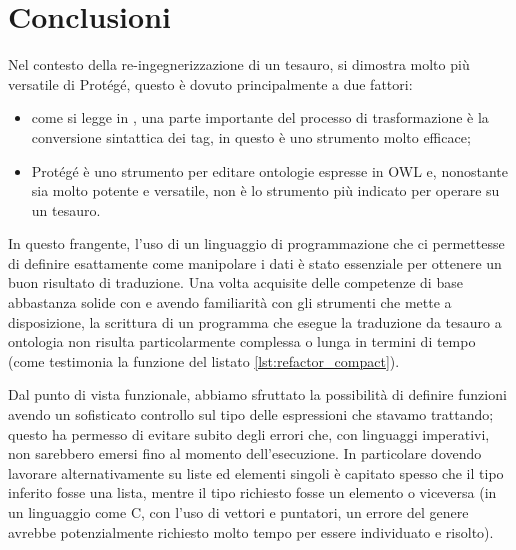 \section{Conclusioni}
Nel contesto della re-ingegnerizzazione di un tesauro, \cduce si dimostra molto più versatile di Protégé, questo è dovuto principalmente a due fattori:
\begin{itemize}
	\item come si legge in \cite{re_engineeringThesaurus}, una parte importante del processo di trasformazione è la conversione sintattica dei tag, in questo \cduce è uno strumento molto efficace;
	\item Protégé è uno strumento per editare ontologie espresse in OWL \cite{protege_doc} e, nonostante sia molto potente e versatile, non è lo strumento più indicato per operare su un tesauro.
\end{itemize}
In questo frangente, l'uso di un linguaggio di programmazione che ci permettesse di definire esattamente come manipolare i dati è stato essenziale per ottenere un buon risultato di traduzione. Una volta acquisite delle competenze di base abbastanza solide con \cduce e avendo familiarità con gli strumenti che mette a disposizione, la scrittura di un programma che esegue la traduzione da tesauro a ontologia non risulta particolarmente complessa o lunga in termini di tempo (come testimonia la funzione del listato \ref{lst:refactor_compact}).

Dal punto di vista funzionale, abbiamo sfruttato la possibilità di definire funzioni avendo un sofisticato controllo sul tipo delle espressioni che stavamo trattando; questo ha permesso di evitare subito degli errori che, con linguaggi imperativi, non sarebbero emersi fino al momento dell'esecuzione. In particolare dovendo lavorare alternativamente su liste ed elementi singoli è capitato spesso che il tipo inferito fosse una lista, mentre il tipo richiesto fosse un elemento o viceversa (in un linguaggio come C, con l'uso di vettori e puntatori, un errore del genere avrebbe potenzialmente richiesto molto tempo per essere individuato e risolto).
